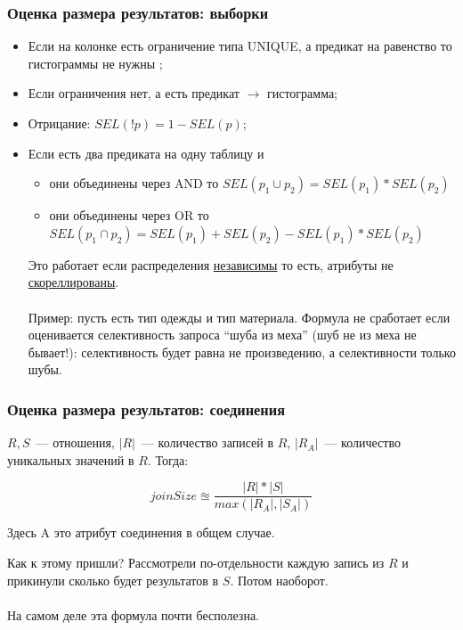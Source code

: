 \documentclass{beamer}
\begin{document}
\begin{frame}
	\frametitle{Оценка размера результатов: выборки}
	
	\begin{itemize}
		\setlength\itemsep{1em}
		\item Если на колонке есть ограничение типа UNIQUE, а предикат на равенство то гистограммы не нужны \smiley{};
		\item Если ограничения нет, а есть предикат $\longrightarrow$ гистограмма;
		\item Отрицание: $SEL(!p) = 1 - SEL(p)$;
		\item Если есть два предиката на одну таблицу и
		\begin{itemize}
			\item они объединены через AND то $SEL(p_1 \cup p_2) = SEL(p_1) *SEL(p_2)$
			\item они объединены через OR то $SEL(p_1 \cap p_2) = SEL(p_1) + SEL(p_2) - SEL(p_1) *SEL(p_2)$
		\end{itemize}
		Это работает если распределения \underline{независимы} то есть, атрибуты не \underline{скореллированы}.\\~\\
		Пример: пусть есть тип одежды и тип материала. Формула не сработает если оценивается селективность запроса ``шуба из меха'' (шуб не из меха не бывает!): селективность будет равна не произведению, а селективности только шубы.
		

		
	\end{itemize}
	
	
\end{frame}

\begin{frame}
	\frametitle{Оценка размера результатов: соединения}
	$R, S$~--- отношения, $|R|$~--- количество записей в $R$, $|R_A|$~--- количество уникальных значений в $R$. Тогда:

	$$ joinSize \approxeq \frac{|R| * |S|}{max(|R_A|, |S_A|)} $$
	
	Здесь A это атрибут соединения в общем случае.
	

	Как к этому пришли? Рассмотрели по-отдельности каждую запись из $R$ и прикинули сколько будет результатов в $S$. Потом наоборот.
	\\~\\
	На самом деле эта формула почти бесполезна.
	
\end{frame}
\end{document}

